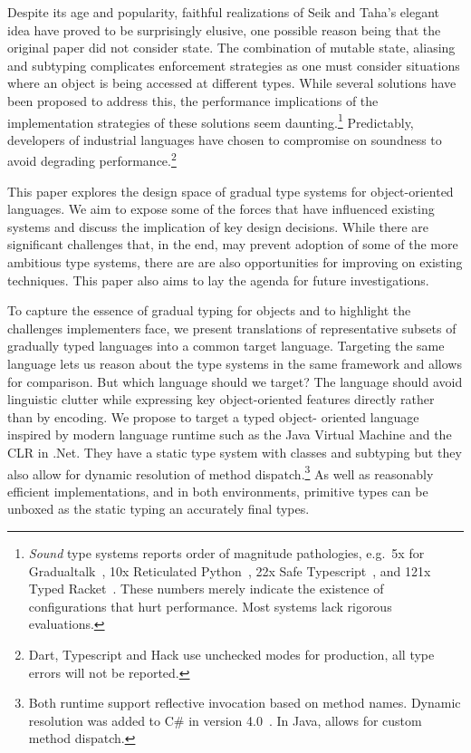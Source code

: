 \documentclass[a4paper,USenglish]{tex/lipics-v2016}
\begin{document}
Despite its age and popularity, faithful realizations of Seik and Taha's
elegant idea have proved to be surprisingly elusive, one possible reason
being that the original paper did not consider state. The combination of
mutable state, aliasing and subtyping complicates enforcement strategies as
one must consider situations where an object is being accessed at different
types. While several solutions have been proposed to address this, the
performance implications of the implementation strategies of these solutions
seem daunting.\footnote{\emph{Sound} type systems reports order of magnitude
  pathologies, e.g.~5x for Gradualtalk~\cite{allende13}, 10x Reticulated
  Python~\cite{siek14}, 22x Safe Typescript~\cite{safe-typescript}, and 121x
  Typed Racket~\cite{popl16}. These numbers merely indicate the existence of
  configurations that hurt performance.  Most systems lack rigorous
  evaluations. } Predictably, developers of industrial languages have chosen
to compromise on soundness to avoid degrading performance.\footnote{Dart,
  Typescript and Hack use unchecked modes for production, all type errors
  will not be reported.}

This paper explores the design space of gradual type systems for object-oriented
languages. We aim to expose some of the forces that have influenced existing
systems and discuss the implication of key design decisions. While there are
significant challenges that, in the end, may prevent adoption of some of the
more ambitious type systems, there are are also opportunities for improving on
existing techniques.  This paper also aims to lay the agenda for future
investigations.

To capture the essence of gradual typing for objects and to highlight the
challenges implementers face, we present translations of representative subsets
of gradually typed languages into a common target language. Targeting the same
language lets us reason about the type systems in the same framework and allows
for comparison. But which language should we target? The language should avoid
linguistic clutter while expressing key object-oriented features directly rather
than by encoding. We propose to target a typed object- oriented language
inspired by modern language runtime such as the Java Virtual Machine and the
CLR in .Net. They have a static type system with classes and subtyping but they
also allow for dynamic resolution of method dispatch.\footnote{Both runtime
support reflective invocation based on method names. Dynamic resolution was
added to C\# in version 4.0~\cite{BAT14}. In Java,  allows for
custom method dispatch.} As well as reasonably efficient implementations, and in
both environments, primitive types can be unboxed as the static typing an
accurately final types.
\end{document}
